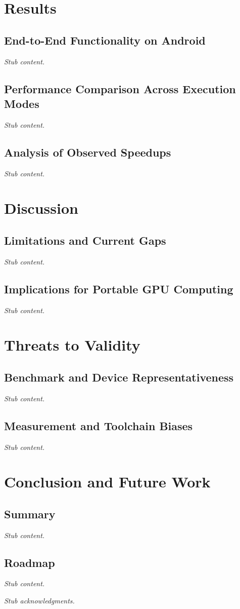 \documentclass[sigconf]{acmart}
\begin{document}
\section{Results}
\subsection{End-to-End Functionality on Android}
\textit{Stub content.}

\subsection{Performance Comparison Across Execution Modes}
\textit{Stub content.}

\subsection{Analysis of Observed Speedups}
\textit{Stub content.}

\section{Discussion}
\subsection{Limitations and Current Gaps}
\textit{Stub content.}

\subsection{Implications for Portable GPU Computing}
\textit{Stub content.}

\section{Threats to Validity}
\subsection{Benchmark and Device Representativeness}
\textit{Stub content.}

\subsection{Measurement and Toolchain Biases}
\textit{Stub content.}

\section{Conclusion and Future Work}
\subsection{Summary}
\textit{Stub content.}

\subsection{Roadmap}
\textit{Stub content.}

\begin{acks}
\textit{Stub acknowledgments.}
\end{acks}



\end{document}
